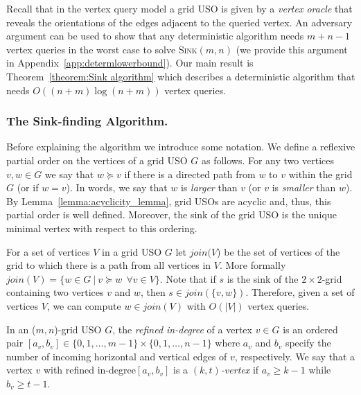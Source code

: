 \documentclass[runningheads,a4paper]{llncs}
\newcommand{\JN}[1]{\marginpar{\parbox{3.6cm}{{\small {\bf JN:} #1}}}} %
\newcommand{\indegree}{refined in-degree\xspace}
\newcommand{\sinkmn}{\textsc{Sink}$(m,n)$\xspace}
\begin{document}
Recall that in the vertex query model a grid USO is given by a \emph{vertex oracle} that reveals the orientations of the edges adjacent to the queried vertex. 
An adversary argument can be used to show that any deterministic algorithm needs $m+n-1$ vertex queries in the worst case to solve \sinkmn
(we provide this argument in Appendix~\ref{app:determlowerbound}).
Our main result is Theorem~\ref{theorem:Sink algorithm} which describes a deterministic algorithm that needs $O((n + m) \log (n + m))$ vertex queries. 

\subsubsection{The Sink-finding Algorithm.}
\label{section:the_sink_finding_algorithm}

Before explaining the algorithm we introduce some notation. We define a reflexive partial order on the vertices of a grid USO $G$ as follows. 
For any two vertices $v,w \in G$ we say that $w \succeq v$ if there is a directed path from $w$ to $v$ within the grid $G$ (or if $w = v$). 
In words, we say that $w$ is \emph{larger} than $v$ (or $v$ is \emph{smaller} than $w$).
By Lemma~\ref{lemma:acyclicity_lemma}, grid USOs are acyclic and, thus, this partial order is well defined.
Moreover, the sink of the grid USO is the unique minimal vertex with respect to this ordering. 

For a set of vertices $V$ in a grid USO $G$ let $join(V$) be the set of vertices of the grid to which there is a path from all vertices in $V$.  More formally $join(V) = \{w \in G \: | \: v \succeq w \:\: \forall v \in V \}$. Note that if $s$ is the sink of the $2\times 2$-grid containing two vertices $v$ and $w$, then $s \in join(\{v,w\})$. Therefore, given a set of vertices $V$, we can compute  $w \in join(V)$ with $O(|V|)$ vertex queries.


In an ($m,n$)-grid USO $G$, the \emph{\indegree} of a vertex $v \in G$ is an ordered pair $[a_v, b_v] \in \{0,1,\ldots,m-1\}\times \{0,1,\ldots,n-1\}$ where $a_v$ and $b_v$ specify the number of incoming horizontal  and vertical edges of $v$, respectively.
We say that a vertex $v$ with \indegree $[a_v, b_v]$ is a \emph{$(k, t)$-vertex} if $a_v\geq k-1$ while $b_v\geq t-1$.
\end{document}
